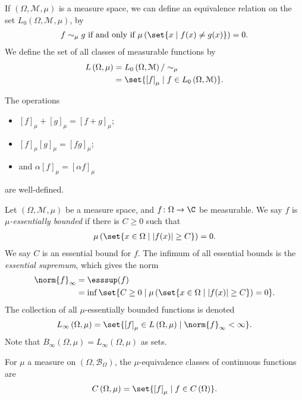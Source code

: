 \begin{definition}
  If $\left(\Omega,\mathcal{M},\mu\right)$ is a measure space, we can define an equivalence relation on the set $L_{0}\left(\Omega,\mathcal{M},\mu\right)$, by
  \begin{align*}
    f\sim_{\mu}g \text{ if and only if } \mu\left(\set{x\mid f(x)\neq g(x)}\right) = 0.
  \end{align*}
  We define the set of all classes of measurable functions by
  \begin{align*}
    L\left(\Omega,\mu\right) &= L_{0}\left(\Omega,\mathcal{M}\right)/\sim_{\mu}\\
                             &= \set{\left[f\right]_{\mu}\mid f\in L_{0}\left(\Omega,\mathcal{M}\right)}.
  \end{align*}
\end{definition}
\begin{fact}
  The operations
  \begin{itemize}
    \item $\displaystyle \left[f\right]_{\mu} + \left[g\right]_{\mu} = \left[f + g\right]_{\mu}$;
    \item $\displaystyle \left[f\right]_{\mu}\left[g\right]_{\mu} = \left[fg\right]_{\mu}$;
    \item and $\displaystyle \alpha \left[f\right]_{\mu} = \left[\alpha f\right]_{\mu}$
  \end{itemize}
  are well-defined.
\end{fact}
\begin{definition}
  Let $\left(\Omega,\mathcal{M},\mu\right)$ be a measure space, and $f\colon \Omega\rightarrow \C$ be measurable. We say $f$ is \textit{$\mu$-essentially bounded} if there is $C\geq 0$ such that
  \begin{align*}
    \mu\left(\set{x\in \Omega\mid \left\vert f(x) \right\vert\geq C}\right) = 0.
  \end{align*}
  We say $C$ is an essential bound for $f$. The infimum of all essential bounds is the \textit{essential supremum}, which gives the norm
  \begin{align*}
    \norm{f}_{\infty} &= \esssup(f)\\
                      &= \inf\set{C\geq 0 \mid \mu\left(\set{x\in \Omega\mid \left\vert f(x) \right\vert\geq C}\right) = 0}.
  \end{align*}
  The collection of all $\mu$-essentially bounded functions is denoted
  \begin{align*}
    L_{\infty}\left(\Omega,\mu\right) = \set{\left[f\right]_{\mu}\in L\left(\Omega,\mu\right)\mid \norm{f}_{\infty} < \infty}.
  \end{align*}
  Note that $B_{\infty}\left(\Omega,\mu\right) = L_{\infty}\left(\Omega,\mu\right)$ as sets.\newline

  For $\mu$ a measure on $\left(\Omega,\mathcal{B}_{\Omega}\right)$, the $\mu$-equivalence classes of continuous functions are
  \begin{align*}
    C\left(\Omega,\mu\right) = \set{\left[f\right]_{\mu}\mid f\in C\left(\Omega\right)}.
  \end{align*}
\end{definition}
